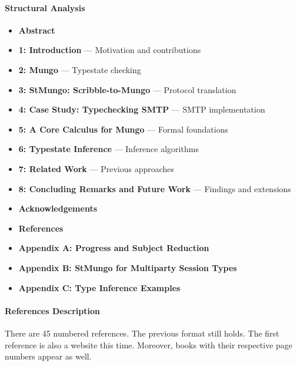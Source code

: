 \documentclass{article}
\begin{document}
\paragraph{Structural Analysis}
\begin{itemize}
    \item \textbf{Abstract}

    \item \textbf{1: Introduction} --- Motivation and contributions

    \item \textbf{2: Mungo} --- Typestate checking

    \item \textbf{3: StMungo: Scribble-to-Mungo} --- Protocol translation

    \item \textbf{4: Case Study: Typechecking SMTP} --- SMTP implementation

    \item \textbf{5: A Core Calculus for Mungo} --- Formal foundations

    \item \textbf{6: Typestate Inference} --- Inference algorithms

    \item \textbf{7: Related Work} --- Previous approaches

    \item \textbf{8: Concluding Remarks and Future Work} --- Findings and extensions

    \item \textbf{Acknowledgements}

    \item \textbf{References}

    \item \textbf{Appendix A: Progress and Subject Reduction}

    \item \textbf{Appendix B: StMungo for Multiparty Session Types}

    \item \textbf{Appendix C: Type Inference Examples}
\end{itemize}

\paragraph{References Description}
There are 45 numbered references. The previous format still holds.
The first reference is also a website this time. Moreover, books with their respective page numbers appear as well.
\end{document}
